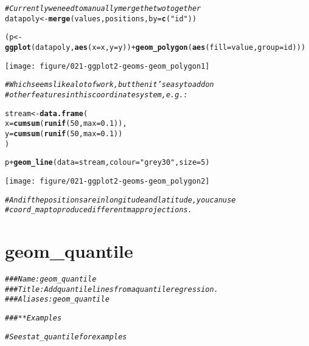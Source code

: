 \documentclass[a4paper,titlepage]{tufte-handout}\usepackage[]{graphicx}\usepackage[]{color}
\makeatletter
\def\maxwidth{ %
  \ifdim\Gin@nat@width>\linewidth
    \linewidth
  \else
    \Gin@nat@width
  \fi
}
\newcommand{\hlnum}[1]{\textcolor[rgb]{0.686,0.059,0.569}{#1}}%
\newcommand{\hlstr}[1]{\textcolor[rgb]{0.192,0.494,0.8}{#1}}%
\newcommand{\hlcom}[1]{\textcolor[rgb]{0.678,0.584,0.686}{\textit{#1}}}%
\newcommand{\hlopt}[1]{\textcolor[rgb]{0,0,0}{#1}}%
\newcommand{\hlstd}[1]{\textcolor[rgb]{0.345,0.345,0.345}{#1}}%
\newcommand{\hlkwb}[1]{\textcolor[rgb]{0.69,0.353,0.396}{#1}}%
\newcommand{\hlkwc}[1]{\textcolor[rgb]{0.333,0.667,0.333}{#1}}%
\newcommand{\hlkwd}[1]{\textcolor[rgb]{0.737,0.353,0.396}{\textbf{#1}}}%
\newenvironment{kframe}{%
 \def\at@end@of@kframe{}%
 \ifinner\ifhmode%
  \def\at@end@of@kframe{\end{minipage}}%
  \begin{minipage}{\columnwidth}%
 \fi\fi%
 \def\FrameCommand##1{\hskip\@totalleftmargin \hskip-\fboxsep
 \colorbox{shadecolor}{##1}\hskip-\fboxsep
     \hskip-\linewidth \hskip-\@totalleftmargin \hskip\columnwidth}%
 \MakeFramed {\advance\hsize-\width
   \@totalleftmargin\z@ \linewidth\hsize
   \@setminipage}}%
 {\par\unskip\endMakeFramed%
 \at@end@of@kframe}
\newenvironment{knitrout}{}{} %
\makeatother
\begin{document}
\begin{knitrout}
\begin{kframe}
\begin{alltt}
\hlcom{# Currently we need to manually merge the two together}
\hlstd{datapoly} \hlkwb{<-} \hlkwd{merge}\hlstd{(values, positions,} \hlkwc{by}\hlstd{=}\hlkwd{c}\hlstd{(}\hlstr{"id"}\hlstd{))}

\hlstd{(p} \hlkwb{<-} \hlkwd{ggplot}\hlstd{(datapoly,} \hlkwd{aes}\hlstd{(}\hlkwc{x}\hlstd{=x,} \hlkwc{y}\hlstd{=y))} \hlopt{+} \hlkwd{geom_polygon}\hlstd{(}\hlkwd{aes}\hlstd{(}\hlkwc{fill}\hlstd{=value,} \hlkwc{group}\hlstd{=id)))}
\end{alltt}
\end{kframe}
\texttt{[image: figure/021-ggplot2-geoms-geom\_polygon1]} 
\begin{kframe}\begin{alltt}
\hlcom{# Which seems like a lot of work, but then it's easy to add on}
\hlcom{# other features in this coordinate system, e.g.:}

\hlstd{stream} \hlkwb{<-} \hlkwd{data.frame}\hlstd{(}
  \hlkwc{x} \hlstd{=} \hlkwd{cumsum}\hlstd{(}\hlkwd{runif}\hlstd{(}\hlnum{50}\hlstd{,} \hlkwc{max} \hlstd{=} \hlnum{0.1}\hlstd{)),}
  \hlkwc{y} \hlstd{=} \hlkwd{cumsum}\hlstd{(}\hlkwd{runif}\hlstd{(}\hlnum{50}\hlstd{,}\hlkwc{max} \hlstd{=} \hlnum{0.1}\hlstd{))}
\hlstd{)}

\hlstd{p} \hlopt{+} \hlkwd{geom_line}\hlstd{(}\hlkwc{data} \hlstd{= stream,} \hlkwc{colour}\hlstd{=}\hlstr{"grey30"}\hlstd{,} \hlkwc{size} \hlstd{=} \hlnum{5}\hlstd{)}
\end{alltt}
\end{kframe}
\texttt{[image: figure/021-ggplot2-geoms-geom\_polygon2]} 
\begin{kframe}\begin{alltt}
\hlcom{# And if the positions are in longitude and latitude, you can use}
\hlcom{# coord_map to produce different map projections.}
\end{alltt}
\end{kframe}
\end{knitrout}


\section{geom\_quantile}

\begin{knitrout}
\color{fgcolor}\begin{kframe}
\begin{alltt}
\hlcom{### Name: geom_quantile}
\hlcom{### Title: Add quantile lines from a quantile regression.}
\hlcom{### Aliases: geom_quantile}

\hlcom{### ** Examples}

\hlcom{# See stat_quantile for examples}
\end{alltt}
\end{kframe}
\end{knitrout}
\end{document}
